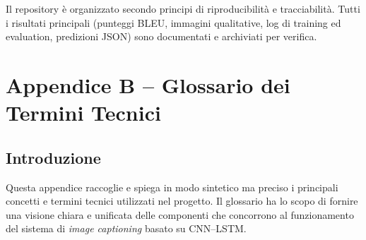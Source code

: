 \documentclass[11pt,a4paper]{report}
\begin{document}
\begin{tcolorbox}[title=Buone pratiche finali]
Il repository è organizzato secondo principi di riproducibilità e tracciabilità.  
Tutti i risultati principali (punteggi BLEU, immagini qualitative, log di training ed evaluation, predizioni JSON) sono documentati e archiviati per verifica.
\end{tcolorbox}


\chapter*{Appendice B – Glossario dei Termini Tecnici}

\section*{Introduzione}

Questa appendice raccoglie e spiega in modo sintetico ma preciso i principali concetti e termini tecnici utilizzati nel progetto.  
Il glossario ha lo scopo di fornire una visione chiara e unificata delle componenti che concorrono al funzionamento del sistema di \emph{image captioning} basato su CNN–LSTM.

\bigskip
\end{document}
